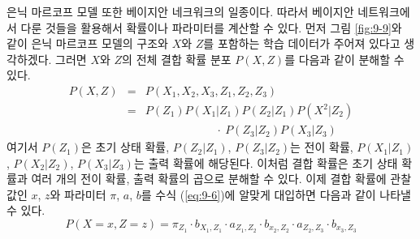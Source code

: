 \documentclass[a4paper]{oblivoir}
\begin{document}
은닉 마르코프 모델 또한 베이지안 네크워크의 일종이다. 따라서 베이지안 네트워크에서 다룬 것들을 활용해서 확률이나 파라미터를 계산할 수 있다. 먼저 그림 \ref{fig:9-9}와 같이 은닉 마르코프 모델의 구조와 $X$와 $Z$를 포함하는 학습 데이터가 주어져 있다고 생각하겠다. 그러면 $X$와 $Z$의 전체 결합 확률 분포 $P(X,Z)$를 다음과 같이 분해할 수 있다. 
\begin{eqnarray}
P(X,Z) & = & P(X_{1},X_{2},X_{3},Z_{1},Z_{2},Z_{3}) \nonumber \\
& = & P(Z_{1}) P(X_{1}|Z_{1}) P(Z_{2}|Z_{1}) P(X^{2}|Z_{2}) \nonumber \\ 
& & \ \ \ \ \ \ \ \ \ \ \ \ \ \ \ \ \ \ \ \ \ \ \ \ \ \ \ \ \cdot \ P(Z_{3}|Z_{2}) P(X_{3}|Z_{3}) \label{eq:9-6}
\end{eqnarray}
여기서 $P(Z_{1})$은 초기 상태 확률, $P(Z_{2}|Z_{1})$, $P(Z_{3}|Z_{2})$는 전이 확률, $P(X_{1}|Z_{1})$, $P(X_{2}|Z_{2})$, $P(X_{3}|Z_{3})$는 출력 확률에 해당된다. 이처럼 결합 확률은 초기 상태 확률과 여러 개의 전이 확률, 출력 확률의 곱으로 분해할 수 있다. 이제 결합 확률에 관찰값인 $x$, $z$와 파라미터 $\pi$, $a$, $b$를 수식 (\ref{eq:9-6})에 알맞게 대입하면 다음과 같이 나타낼 수 있다.  
\begin{equation}
P(X=x,Z=z) = {\pi}_{Z_{1}} \cdot {b}_{X_{1},Z_{1}} \cdot {a}_{Z_{1}, Z_{2}} \cdot {b}_{x_{2},Z_{2}} \cdot {a}_{Z_{2}, Z_{3}} \cdot {b}_{x_{3},Z_{3}} \label{eq:9-7} 
\end{equation} 
\end{document}
